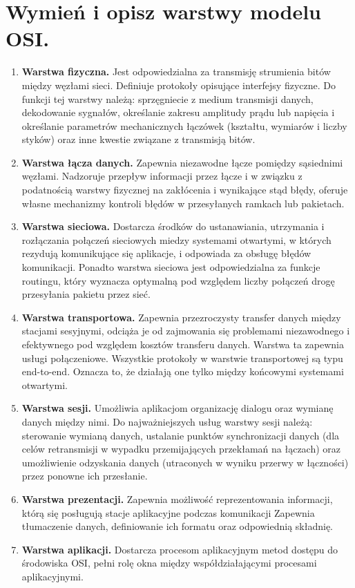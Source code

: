 \documentclass[12pt,a4paper]{article}
\begin{document}
	\section{Wymień i opisz warstwy modelu OSI.}
	\begin{enumerate}
	\item \textbf{Warstwa fizyczna.} Jest odpowiedzialna za transmisję strumienia bitów między węzłami sieci. Definiuje protokoły opisujące interfejsy fizyczne. Do funkcji tej warstwy należą: sprzęgniecie z medium transmisji danych, dekodowanie sygnałów, określanie zakresu amplitudy prądu lub napięcia i określanie parametrów mechanicznych łączówek (kształtu, wymiarów i liczby styków) oraz inne kwestie związane z transmisją bitów. 
	\item \textbf{Warstwa łącza danych.} Zapewnia niezawodne łącze pomiędzy sąsiednimi węzłami. Nadzoruje przepływ informacji przez łącze i w związku z podatnością warstwy fizycznej na zakłócenia i wynikające stąd błędy, oferuje własne mechanizmy kontroli błędów w przesyłanych ramkach lub pakietach.
	\item \textbf{Warstwa sieciowa.} Dostarcza środków do ustanawiania, utrzymania i rozłączania połączeń sieciowych miedzy systemami otwartymi, w których rezydują komunikujące się aplikacje, i odpowiada za obsługę błędów komunikacji. Ponadto warstwa sieciowa jest odpowiedzialna za funkcje routingu, który wyznacza optymalną pod względem liczby połączeń drogę przesyłania pakietu przez sieć.
	\item \textbf{Warstwa transportowa.} Zapewnia przezroczysty transfer danych między stacjami sesyjnymi, odciąża je od zajmowania się problemami niezawodnego i efektywnego pod względem kosztów transferu danych. Warstwa ta zapewnia usługi połączeniowe. Wszystkie protokoły w warstwie transportowej są typu end-to-end. Oznacza to, że działają one tylko między końcowymi systemami otwartymi.
	\item \textbf{Warstwa sesji.} Umożliwia aplikacjom organizację dialogu oraz wymianę danych między nimi. Do najważniejszych usług warstwy sesji należą: sterowanie wymianą danych, ustalanie punktów synchronizacji danych (dla celów retransmisji w wypadku przemijających przekłamań na łączach) oraz umożliwienie odzyskania danych (utraconych w wyniku przerwy w łączności) przez ponowne ich przesłanie.
	\item \textbf{Warstwa prezentacji.} Zapewnia możliwość reprezentowania informacji, którą się posługują stacje aplikacyjne podczas komunikacji Zapewnia tłumaczenie danych, definiowanie ich formatu oraz odpowiednią składnię.
	\item \textbf{Warstwa aplikacji.} Dostarcza procesom aplikacyjnym metod dostępu do środowiska OSI, pełni rolę okna między współdziałającymi procesami aplikacyjnymi.
	\end{enumerate}
\end{document}
